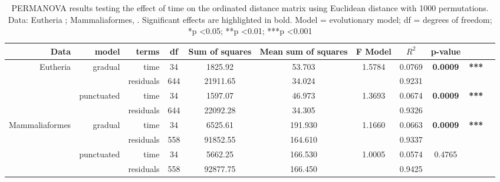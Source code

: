 \documentclass[12pt,letterpaper]{article}
\begin{document}
\begin{landscape}
\begin{table}[!ht]
\caption{PERMANOVA results testing the effect of time on the ordinated distance matrix using Euclidean distance with 1000 permutations. %
Data: Eutheria \citep[data from][]{beckancient2014}; Mammaliaformes, \citep[data from][]{Slater2012MEE}. Significant effects are highlighted in bold. Model = evolutionary model; df = degrees of freedom;  *p \textless 0.05; **p \textless 0.01; ***p \textless 0.001} %
\label{tab:Tab_permanova}
\centering
\begin{tabular}{rrrcccccccc}
  \hline
 Data & model & terms & df & Sum of squares & Mean sum of squares & F Model & $R^2$ & p-value & \\ 
  \hline
Eutheria     & gradual    & time      & 34  & 1825.92  & 53.703  & 1.5784 & 0.0769 & \textbf{0.0009}& \textbf{***} \\ 
              &            & residuals & 644 & 21911.65 & 34.024  &        & 0.9231 &  &\\ 
              & punctuated & time      & 34  & 1597.07  & 46.973  & 1.3693 & 0.0674 & \textbf{0.0009}& \textbf{***} \\ 
              &            & residuals & 644 & 22092.28 & 34.305  &        & 0.9326 &  &\\ 
Mammaliaformes & gradual    & time      & 34  & 6525.61  & 191.930 & 1.1660 & 0.0663 & \textbf{0.0009}& \textbf{***} \\ 
              &            & residuals & 558 & 91852.55 & 164.610 &        & 0.9337 &  &\\ 
              & punctuated & time      & 34  & 5662.25  & 166.530 & 1.0005 & 0.0574 & 0.4765 &\\ 
              &            & residuals & 558 & 92877.75 & 166.450 &        & 0.9425 &  &\\ 
   \hline
\end{tabular}
\end{table}
\end{landscape}
\end{document}
